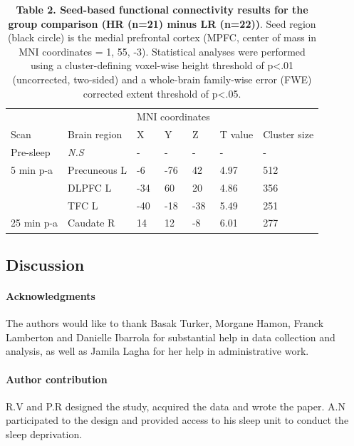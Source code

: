 \begin{table}[!htbp]
    \caption*{\textbf{Table 2. Seed-based functional connectivity results for the group comparison (HR (n=21) minus LR (n=22))}. Seed region (black circle) is the medial prefrontal cortex (MPFC, center of mass in MNI coordinates = 1, 55, -3). Statistical analyses were performed using a cluster-defining voxel-wise height threshold of p<.01 (uncorrected, two-sided) and a whole-brain family-wise error (FWE) corrected extent threshold of p<.05.}
    \begin{tabularx}{\textwidth}{lXlllXX}
    \toprule
                &              & \multicolumn{3}{l}{MNI coordinates} &              &              \\
    Scan        & Brain region & X          & Y          & Z         & T value      & Cluster size \\ \midrule
    Pre-sleep   & \textit{N.S} & -          & -          & -         & -            & -            \\
    5 min p-a   & Precuneous L & -6         & -76        & 42        & 4.97         & 512          \\
                & DLPFC L      & -34        & 60         & 20        & 4.86         & 356          \\
                & TFC L        & -40        & -18        & -38       & 5.49         & 251          \\
    25 min p-a  & Caudate R    & 14         & 12         & -8        & 6.01         & 277          \\ \bottomrule
    \end{tabularx}
\end{table}

\subsection*{Discussion}
\label{res:inertia:drf:discussion}


\paragraph{Acknowledgments}
The authors would like to thank Basak Turker, Morgane Hamon, Franck Lamberton and Danielle Ibarrola for substantial help in data collection and analysis, as well as Jamila Lagha for her help in administrative work.

\paragraph{Author contribution}
R.V and P.R designed the study, acquired the data and wrote the paper. A.N participated to the design and provided access to his sleep unit to conduct the sleep deprivation.

